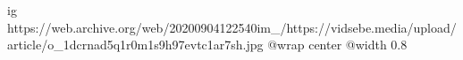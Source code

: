  
 
 
 
 

\ifcmt
  ig https://web.archive.org/web/20200904122540im_/https://vidsebe.media/upload/article/o_1dcrnad5q1r0m1s9h97evtc1ar7sh.jpg
  @wrap center
  @width 0.8
\fi

